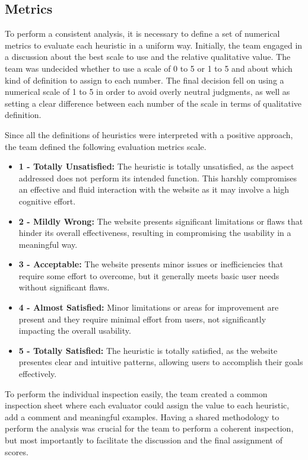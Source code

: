 
\subsection{Metrics}

To perform a consistent analysis, it is necessary to define a set of numerical metrics to evaluate each heuristic in a uniform way.
Initially, the team engaged in a discussion about the best scale to use and the relative qualitative value. The team was undecided whether to use a scale of 0 to 5 or 1 to 5 and about which kind of definition to assign to each number.
The final decision fell on using a numerical scale of 1 to 5 in order to avoid overly neutral judgments, as well as setting a clear difference between each number of the scale in terms of qualitative definition. 

Since all the definitions of heuristics were interpreted with a positive approach, the team defined the following evaluation metrics scale.
\begin{itemize}
    \item \textbf{1 - Totally Unsatisfied:} The heuristic is totally unsatisfied, as the aspect addressed does not perform its intended function. This harshly compromises an effective and fluid interaction with the website as it may involve a high cognitive effort.
    \item \textbf{2 - Mildly Wrong:} The website presents significant limitations or flaws that hinder its overall effectiveness, resulting in compromising the usability in a meaningful way.
    \item \textbf{3 - Acceptable:} The website presents minor issues or inefficiencies that require some effort to overcome, but it generally meets basic user needs without significant flaws.
    \item \textbf{4 - Almost Satisfied:} Minor limitations or areas for improvement are present and they require minimal effort from users, not significantly impacting the overall usability.
    \item \textbf{5 - Totally Satisfied:} The heuristic is totally satisfied, as the website presentes clear and intuitive patterns, allowing users to accomplish their goals effectively.
\end{itemize}

To perform the individual inspection easily, the team created a common inspection sheet where each evaluator could assign the value to each heuristic, add a comment and meaningful examples. Having a shared methodology to perform the analysis was crucial for the team to perform a coherent inspection, but most importantly to facilitate the discussion and the final assignment of scores.